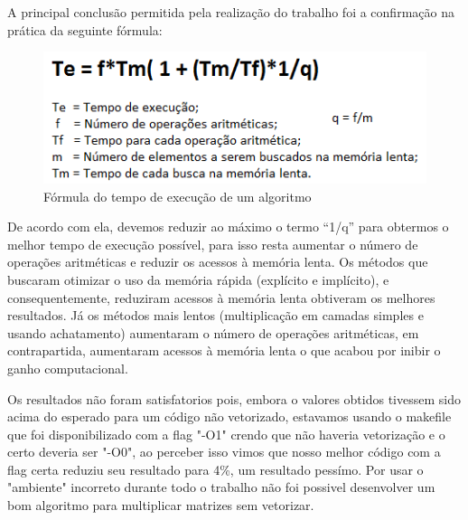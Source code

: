 \documentclass[a4paper, 10pt]{article}
\begin{document}
A principal conclusão permitida pela realização do trabalho foi a confirmação na prática da seguinte fórmula:
\begin{figure}[!h]
\centering
\includegraphics[scale=0.7]{formula}
\caption{Fórmula do tempo de execução de um algoritmo}
\label{Fórmula}
\end{figure}

De acordo com ela, devemos reduzir ao máximo o termo “1/q” para obtermos o melhor tempo de execução possível, para isso resta aumentar o número de operações aritméticas e reduzir os acessos à memória lenta. Os métodos que buscaram otimizar o uso da memória rápida (explícito e implícito), e consequentemente, reduziram acessos à memória lenta obtiveram os melhores resultados. Já os métodos mais lentos (multiplicação em camadas simples e usando achatamento) aumentaram o número de operações aritméticas, em contrapartida, aumentaram acessos à memória lenta o que acabou por inibir o ganho computacional.

Os resultados não foram satisfatorios pois, embora o valores obtidos tivessem sido acima do esperado para um código não vetorizado, estavamos usando o makefile que foi disponibilizado com a flag "-O1" crendo que não haveria vetorização e o certo deveria ser "-O0", ao perceber isso vimos que nosso melhor código com a flag certa reduziu seu resultado para 4\%, um resultado pessímo. Por usar o "ambiente" incorreto durante todo o trabalho não foi possivel desenvolver um bom algoritmo para multiplicar matrizes sem vetorizar.
\end{document}
